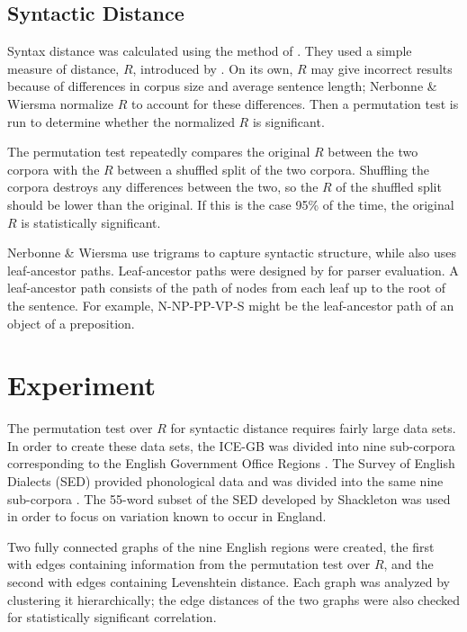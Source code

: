\documentclass[11pt,letterpaper]{article}
\begin{document}
\subsection{Syntactic Distance}
Syntax distance was calculated using the method of
. They used a simple measure of distance,
$R$, introduced by . On its own, $R$ may give
incorrect results because of differences in corpus size and average
sentence length; Nerbonne \& Wiersma normalize $R$ to account for
these differences. Then a permutation test is run to determine whether the
normalized $R$ is significant.

The permutation test repeatedly compares the original $R$ between the
two corpora with the $R$ between a shuffled split of the two
corpora. Shuffling the corpora destroys any differences between the
two, so the $R$ of the shuffled split should be lower than the
original. If this is the case 95\% of the time, the original $R$ is
statistically significant.

Nerbonne \& Wiersma use trigrams to capture syntactic structure, while
 also uses leaf-ancestor
paths. Leaf-ancestor paths were designed by
 for parser evaluation. A leaf-ancestor path
consists of the path of nodes from each leaf up to the root of the
sentence. For example,
N-NP-PP-VP-S might be the leaf-ancestor path of an object of a preposition.

\section{Experiment}

The permutation test over $R$ for syntactic distance requires fairly
large data sets. In order to create these data sets, the ICE-GB was
divided into nine sub-corpora corresponding to the English Government
Office Regions \cite{nelson02}. The Survey of English Dialects (SED)
provided phonological data and was divided into the same nine
sub-corpora \cite{orton63}. The 55-word subset of the SED developed by
Shackleton was used in order to focus on variation known to occur in
England.

Two fully connected graphs of the nine English regions were created,
the first with edges containing information
from the permutation test over $R$, and the second with edges containing
Levenshtein distance. Each graph was analyzed by clustering it
hierarchically; the edge distances of the two graphs were also
checked for statistically significant correlation.
\end{document}
